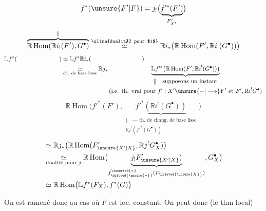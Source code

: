 \[
f^*(\unsure{F'|F})=j_!\bigl(\underbrace{f'^*(F')}_{F'_{X'}}\bigr)
\]
\[
\overbrace{\mathbb{R}\operatorname{Hom}(\mathbb{R}i_!(F'),G^\bullet)}^{\Vert}
\overset{\text{\uline{dualité pour $i$}}}{\simeq}
\mathbb{R}i_*\bigl(\mathbb{R}\operatorname{Hom}(F',\mathbb{R}i^!(G^\bullet))\bigr)
\]
\[
\begin{aligned}
\mathbb{L}f^*(\hspace{2.5cm})&\simeq \mathbb{L}f^*\mathbb{R}i_*(\hspace{3cm})\\
&\underset{\text{ch. de base lisse}}{\simeq}
\mathbb{R}j_*\underbrace{\mathbb{L}f'^*\bigl(\mathbb{R}\operatorname{Hom}(F',\mathbb{R}i^!(G^\bullet))\bigr)}_{
\begin{gathered}
\Vert\quad\text{supposons un instant}\\
\text{(i.e. th. vrai pour $f':X'\unsure{-|\longrightarrow}Y'$ et $F',\mathbb{R}i^!G^\bullet$)}
\end{gathered}}
\end{aligned}
\]
\[
\mathbb{R}\operatorname{Hom}\bigl(f'^*(F'),
\underbrace{f'^*(\mathbb{R}i^!(G^\bullet))}_{
\begin{gathered}
\Vert\quad\text{--- th. de chang. de base lisse}\\
\mathbb{R}j^!(f'^*(G^\bullet))
\end{gathered}}\bigr)
\]
\[
\begin{aligned}
&\simeq \mathbb{R}j_*\bigl(\mathbb{R}\operatorname{Hom}(F'_{\unsure{X'|X}},\mathbb{R}j^!G_X^\bullet)\bigr)\\
&\underset{\text{dualité pour $j$}}{\simeq}
\mathbb{R}\operatorname{Hom}\bigl(\underbrace{j_!F'_{\unsure{X'|X}})}_{
f^{\inserted{*}}_{\deleted{\unsure{*}}}(F_{\deleted{\unsure{X}}})},G_X^\bullet\bigr)\\
&\simeq \mathbb{R}\operatorname{Hom}\bigl(\mathbb{L}f^*(F_X),f^*(G)\bigr)
\end{aligned}
\]

On est ramené donc au cas où $F$ est loc. constant. On peut donc (le thm  local)

